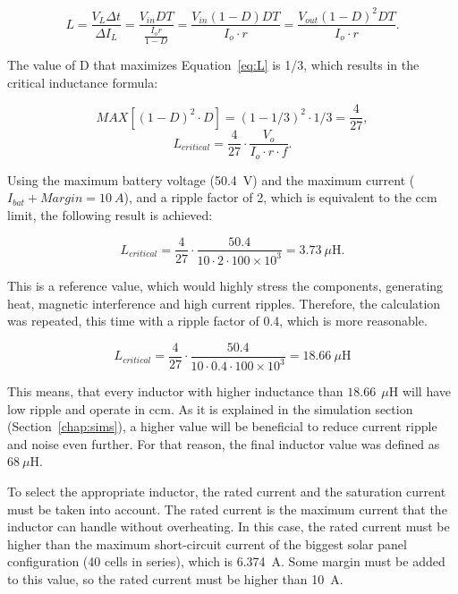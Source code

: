 \begin{equation}
    L = \frac{V_L \Delta t}{\Delta I_L} = \frac{V_{in}DT}{\frac{I_or}{1-D}} = \frac{V_{in} (1-D)DT}{I_o \cdot r} = \frac{V_{out}(1-D)^2DT}{I_o \cdot r} .
    \label{eq:L}
\end{equation}

The value of D that maximizes Equation~\ref{eq:L} is 1/3, which results in the critical inductance formula:

\begin{equation}
    MAX[(1-D)^2\cdot D]= (1-1/3)^2 \cdot 1/3= \frac{4}{27} ,
\end{equation}
\begin{equation}
    L_{critical} = \frac{4}{27} \cdot \frac{V_o}{I_o \cdot r \cdot f} .
\end{equation}

Using the maximum battery voltage (50.4~V) and the maximum current ($I_{bat}+Margin=10~A$), and a ripple factor of 2, which is equivalent  to the \ac{ccm} limit, the following result is achieved:

\begin{equation}
    L_{critical} = \frac{4}{27} \cdot \frac{50.4}{10 \cdot 2 \cdot 100 \times 10^{3}} = 3.73~\mu\mathrm{H} .
\end{equation}

This is a reference value, which would highly stress the components, generating heat, magnetic interference and high current ripples. Therefore, the calculation was repeated, this time with a ripple factor of 0.4, which is more reasonable. 

\begin{equation}
    L_{critical} = \frac{4}{27} \cdot \frac{50.4}{10 \cdot 0.4 \cdot 100 \times 10^{3}} = 18.66~\mu\mathrm{H}
\end{equation}

This means, that every inductor with higher inductance than $18.66~~\mu\mathrm{H}$ will have low ripple and operate in \ac{ccm}. As it is explained in the simulation section (Section~\ref{chap:sims}), a higher value will be beneficial to reduce current ripple and noise even further. For that reason, the final inductor value was defined as $68~\mu\mathrm{H}$.

To select the appropriate inductor, the rated current and the saturation current must be taken into account. The rated current is the maximum current that the inductor can handle without overheating. In this case, the rated current must be higher than the maximum short-circuit current of the biggest solar panel configuration (40 cells in series), which is 6.374~A. Some margin must be added to this value, so the rated current must be higher than 10~A.

